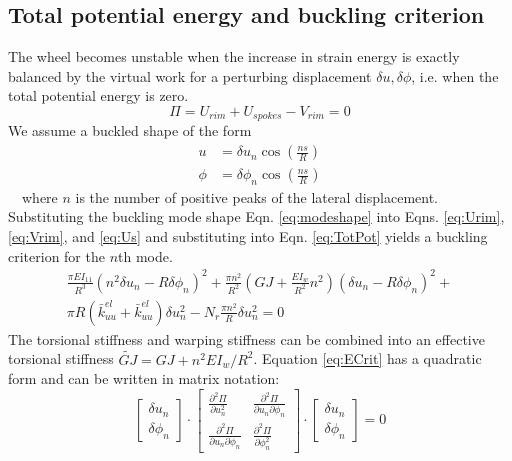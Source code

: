 \documentclass{bmd2016p}
\begin{document}
\subsection{Total potential energy and buckling criterion}
The wheel becomes unstable when the increase in strain energy is exactly balanced by the virtual work for a perturbing displacement $\delta u, \delta\phi$, i.e. when the total potential energy is zero.
	\begin{equation}\label{eq:TotPot}
	\Pi = U_{rim} + U_{spokes} - V_{rim} = 0
	\end{equation}
We assume a buckled shape of the form
	\begin{equation}\label{eq:modeshape}
	\begin{split}
	u &= \delta u_n \cos{\left(\frac{ns}{R}\right)}\\
	\phi &= \delta\phi_n \cos{\left(\frac{ns}{R} \right)}
	\end{split}
	\end{equation}
\,\,\,\, where $n$ is the number of positive peaks of the lateral displacement. Substituting the buckling mode shape Eqn. \ref{eq:modeshape} into Eqns. \ref{eq:Urim}, \ref{eq:Vrim}, and \ref{eq:Us} and substituting into Eqn. \ref{eq:TotPot} yields a buckling criterion for the $n$th mode.
	\begin{multline}\label{eq:ECrit}
	\frac{\pi EI_{11}}{R^3}(n^2 \delta u_n - R\delta\phi_n)^2 + \frac{\pi n^2}{R^2}\left(GJ + \frac{EI_w}{R^2}n^2\right)(\delta u_n-R\delta\phi_n)^2 + \\
	\pi R(\bar{k}_{uu}^{el} + \bar{k}_{uu}^{el})\delta u_n^2 - N_r\frac{\pi n^2}{R}\delta u_n^2=0
	\end{multline}
The torsional stiffness and warping stiffness can be combined into an effective torsional stiffness $\widetilde{GJ} = GJ + n^2EI_w/R^2$. Equation \ref{eq:ECrit} has a quadratic form and can be written in matrix notation:
	\begin{equation}\label{eq:Qform}
	\begin{bmatrix}
	\delta u_n\\\delta\phi_n
	\end{bmatrix} \cdot
	\begin{bmatrix}
	\frac{\partial^2 \Pi}{\partial u_n^2} & \frac{\partial^2 \Pi}{\partial u_n \partial \phi_n}\\
	\frac{\partial^2 \Pi}{\partial u_n\partial\phi_n} & \frac{\partial^2 \Pi}{\partial \phi_n^2}
	\end{bmatrix} \cdot
	\begin{bmatrix}
	\delta u_n\\\delta\phi_n
	\end{bmatrix}
	=0
	\end{equation}
\end{document}

